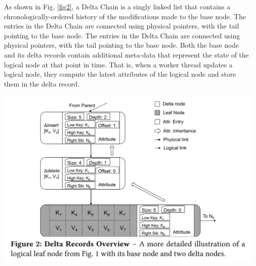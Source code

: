 \documentclass[11pt]{article}
\begin{document}
As shown in Fig. \ref{fig2}, a Delta Chain is a singly linked list that contains a
chronologically-ordered history of the modifications made to the base node. The entries in the Delta
Chain are connected using physical pointers, with the tail pointing to the base node. The entries in
the Delta Chain are connected using physical pointers, with the tail pointing to the base node. Both
the base node and its delta records contain additional meta-data that represent the state of the
logical node at that point in time. That is, when a worker thread updates a logical node, they compute
the latest attributes of the logical node and store them in the delta record.

\begin{center}
\includegraphics[width=.9\textwidth]{../../images/db/30.png}
\label{fig2}
\end{center}
\end{document}
